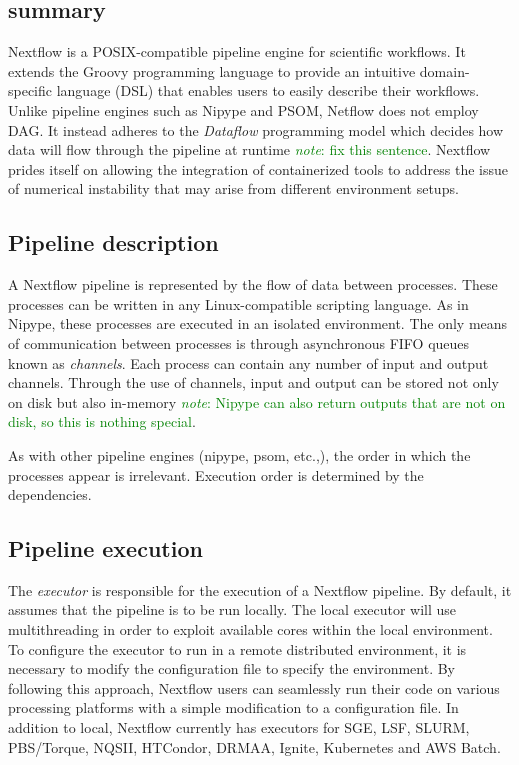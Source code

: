 \documentclass{report}
\newcommand{\note}[1]{\textcolor{green}{\textit{note}: #1}}
\begin{document}
        \subsection{summary}
        Nextflow is a POSIX-compatible pipeline engine for scientific workflows.
It extends the Groovy programming language to provide an  intuitive domain-specific language (DSL) 
that enables users to easily describe their workflows. Unlike pipeline engines such as Nipype and
PSOM, Netflow does not employ DAG. It instead adheres to the
\textit{Dataflow} programming model which decides how data will flow through the pipeline at
runtime \note{fix this sentence}. Nextflow prides itself on allowing the
integration of containerized tools to address the issue of numerical instability
that may arise from different environment setups.
  
        \subsection{Pipeline description}
        A Nextflow pipeline is represented by the flow of data between processes. These
processes can be written in any Linux-compatible scripting language. As in Nipype, 
these processes are executed in an isolated environment. The only means
of communication between processes is through asynchronous FIFO queues known as
\textit{channels}. Each process can contain any number of input and output
channels. Through the use of channels, input and output can be stored not only
on disk but also in-memory \note{Nipype can also return outputs that are not on
disk, so this is nothing special}.  

        As with other pipeline engines (nipype, psom, etc.,), the order in which
the processes appear is irrelevant. Execution order is determined by the dependencies.        

        \subsection{Pipeline execution}
        The \textit{executor} is responsible for the execution of a Nextflow
pipeline. By default, it assumes that the pipeline is to be run locally. The
local executor will use multithreading in order to exploit available cores
within the local environment. To configure the executor to run in a remote distributed environment, it is
necessary to modify the configuration file to specify the environment. By
following this approach, Nextflow users can seamlessly run their code on various
processing platforms with a simple modification to a configuration file. In
addition to local, Nextflow currently has executors for SGE, LSF, SLURM,
PBS/Torque, NQSII, HTCondor, DRMAA, Ignite, Kubernetes and AWS Batch.
\end{document}
